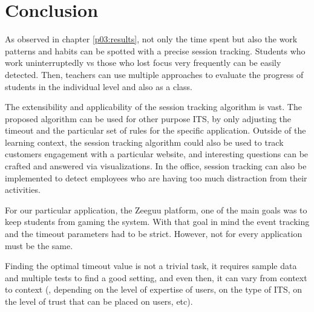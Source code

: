 \chapter{Conclusion}

As observed in chapter \ref{p03:results}, not only the time spent but also the work patterns and habits can be spotted with a precise session tracking. Students who work uninterruptedly vs those who lost focus very frequently can be easily detected. Then, teachers can use multiple approaches to evaluate the progress of students in the individual level and also as a class.

The extensibility and applicability of the session tracking algorithm is vast. The proposed algorithm can be used for other purpose ITS, by only adjusting the timeout and the particular set of rules for the specific application. Outside of the learning context, the session tracking algorithm could also be used to track customers engagement with a particular website, and interesting questions can be crafted and answered via visualizations. In the office, session tracking can also be implemented to detect employees who are having too much distraction from their activities. 

For our particular application, the Zeeguu platform, one of the main goals was to keep students from gaming the system. With that goal in mind the event tracking and the timeout parameters had to be strict. However, not for every application must be the same.

Finding the optimal timeout value is not a trivial task, it requires sample data and multiple tests to find a good setting, and even then, it can vary from context to context (\eg, depending on the level of expertise of users, on the type of ITS, on the level of trust that can be placed on users, etc).


